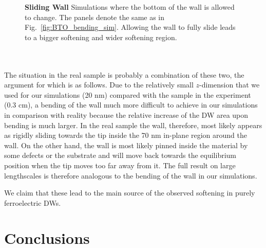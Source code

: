 \begin{figure}
	\caption{\label{fig:BTO_sliding_sim}{\bf Sliding Wall} Simulations where the bottom of the wall is allowed to change. The panels denote the same as in Fig.~\ref{fig:BTO_bending_sim}. Allowing the wall to fully slide leads to a bigger softening and wider softening region.}
\end{figure}
\\\\
The situation in the real sample is probably a combination of these two, the argument for which is as follows.
Due to the relatively small $z$-dimension that we used for our simulations (20 nm) compared with the sample in the experiment (0.3 cm), a bending of the wall much more difficult to achieve in our simulations in comparison with reality because the relative increase of the DW area upon bending is much larger. 
In the real sample the wall, therefore, most likely appears as rigidly sliding towards the tip inside the 70 nm in-plane region around the wall.
On the other hand, the wall is most likely pinned inside the material by some defects or the substrate and will move back towards the equilibrium position when the tip moves too far away from it. The full result on large lengthscales is therefore analogous to the bending of the wall in our simulations.

We claim that these lead to the main source of the observed softening in purely ferroelectric DWs.
\section{Conclusions \label{sec:BTO_conclusion}}

